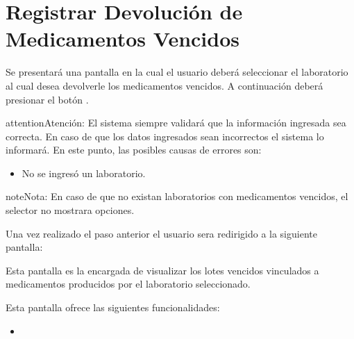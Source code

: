 \documentclass[a4paper,10pt,spanish]{sphinxmanual}
\begin{document}


\section{Registrar Devolución de Medicamentos Vencidos}
\label{devolucionvencidos::doc}\label{devolucionvencidos:registrar-devolucion-de-medicamentos-vencidos}
Se presentará una pantalla en la cual el usuario deberá seleccionar el laboratorio al cual desea devolverle los medicamentos vencidos. A continuación deberá presionar el botón .


\begin{notice}{attention}{Atención:}
El sistema siempre validará que la información ingresada sea correcta. En caso de que los datos ingresados sean incorrectos el sistema lo informará. En este punto, las posibles causas de errores son:
\begin{itemize}
\item {} 
No se ingresó un laboratorio.

\end{itemize}
\end{notice}

\begin{notice}{note}{Nota:}
En caso de que no existan laboratorios con medicamentos vencidos, el selector no mostrara opciones.
\end{notice}

Una vez realizado el paso anterior el usuario sera redirigido a la siguiente pantalla:


Esta pantalla es la encargada de visualizar los lotes vencidos vinculados a medicamentos producidos por el laboratorio seleccionado.

Esta pantalla ofrece las siguientes funcionalidades:
\begin{itemize}
\item {} 
{\hyperref[devolucionvencidos:registrar\string-devolucion]{}}

\end{itemize}
\end{document}
